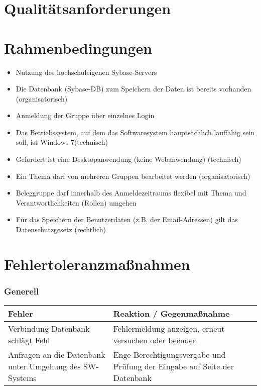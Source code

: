 \documentclass{article}
\begin{document}
\newpage
\part{Qualitätsanforderungen}

\newpage
\part{Rahmenbedingungen}
\begin{itemize}
\item Nutzung des hochschuleigenen Sybase-Servers
\item Die Datenbank (Sybase-DB) zum Speichern der Daten ist bereits vorhanden
(organisatorisch)
\item Anmeldung der Gruppe über einzelnes Login
\item Das Betriebssystem, auf dem das Softwaresystem hauptsächlich lauffähig
sein soll, ist Windows 7(technisch)
\item Gefordert ist eine Desktopanwendung (keine Webanwendung) (technisch)
\item Ein Thema darf von mehreren Gruppen bearbeitet werden (organisatorisch)
\item Beleggruppe darf innerhalb des Anmeldezeitraums flexibel mit Thema und Verantwortlichkeiten (Rollen) umgehen
\item Für das Speichern der Benutzerdaten (z.B. der Email-Adressen) gilt das
Datenschutzgesetz (rechtlich)
\end{itemize}

\newpage
\part{Fehlertoleranzmaßnahmen}

\section{Generell}
\begin{tabular}{|p{7cm}|p{7cm}|}
\hline
	\textbf{Fehler}												&	\textbf{Reaktion / Gegenmaßnahme}						\\
\hline
\hline
	Verbindung Datenbank schlägt Fehl							&	Fehlermeldung anzeigen, erneut versuchen oder beenden	\\
\hline
	Anfragen an die Datenbank unter Umgehung des SW-Systems		&	Enge Berechtigungsvergabe und Prüfung der Eingabe auf Seite der Datenbank \\
\hline
\end{tabular}
\end{document}
